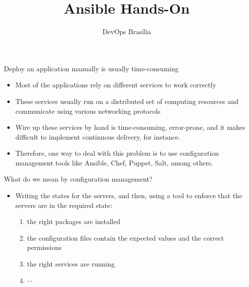 \documentclass[xcolor=dvipsnames,slidestop, mathserif]{beamer}
\title[\hspace{.4in}\insertframenumber/\inserttotalframenumber]{Ansible Hands-On}
\author{DevOps Bras\'ilia}
\begin{document}
\singlespacing 
\begin{frame}[plain]
  \titlepage
\end{frame}



\begin{frame}{Deploy an application manually is usually time-consuming}
	\begin{itemize}
	   \item Most of the applications rely on different services to work correctly
     \item These services usually run on a distributed set of computing resources and communicate using various networking protocols
	   \item Wire up these services by hand is time-consuming, error-prone, and it makes difficult to implement continuous delivery, for instance.
	   \item Therefore, one way to deal with this problem is to use configuration management tools like Ansible, Chef, Puppet, Salt, among others.
	\end{itemize}	
\end{frame}

\begin{frame}{What do we mean by configuration management?}
  \begin{itemize}
     \item Writing the states for the servers, and then, using a tool to enforce that the servers are in the required state:
       \begin{enumerate}
          \item the right packages are installed
	        \item the configuration files contain the expected values and the correct permissions
	        \item the right services are running
	        \item $\cdots$
       \end{enumerate} 
  \end{itemize}
\end{frame}
\end{document}
